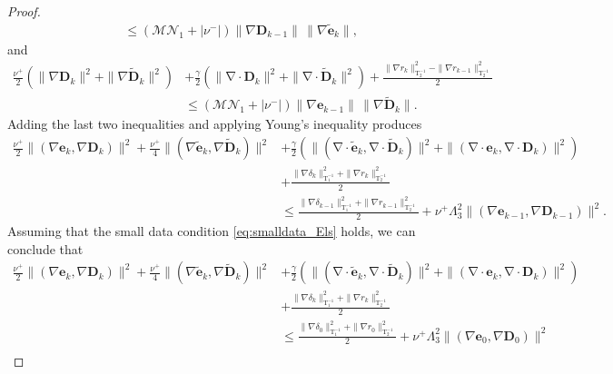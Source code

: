 \documentclass[3p]{elsarticle}
\def\nuplus{\nu^{+}}
\def\numinus{\nu^{-}}
\def\V#1{\mathbf{#1}}
\def\Vt#1{\mathbf{\tilde{#1}}}
\newcommand{\Mbd}{\mathcal{M}}
\newcommand{\Nbd}{\mathcal{N}}
\newcommand{\divergence}{\mathrm{\nabla \cdot}}
\newcommand{\Luinvmap}{\mathrm{T_1^{-1}}}
\newcommand{\Lbinvmap}{\mathrm{T_2^{-1}}}
\begin{document}
\begin{proof}
\begin{equation}
\begin{aligned}
& \le \left(\Mbd \Nbd_1 + |\numinus| \right) \|\nabla \V{D}_{k-1} \|\, \|\nabla \Vt{e}_{k} \|,
\end{aligned}
\end{equation}
and
\begin{equation}\label{eq:err8_Els}
\begin{aligned} 
\frac{\nuplus}{2} \left( \|\nabla \V{D}_{k} \|^2 + \|\nabla \Vt{D}_{k} \|^2 \right) & + 
\frac{\gamma}{2} \left( \|\divergence \V{D}_{k} \|^2 + \|\divergence \Vt{D}_{k} \|^2\right) + \frac{\|\nabla r_{k} \|^2_{\Lbinvmap} - \|\nabla r_{k-1} \|^2_{\Lbinvmap}}{2} \\ 
& \le \left(\Mbd \Nbd_1 + |\numinus| \right) \|\nabla \V{e}_{k-1} \|\, \|\nabla \Vt{D}_{k} \|.
\end{aligned}
\end{equation}
Adding the last two inequalities and applying Young's inequality produces
\begin{equation}\label{eq:err9_Els}   
\begin{aligned}
\frac{\nuplus}{2} \| (\nabla \V{e}_{k},\nabla \V{D}_{k}) \|^2 +  \frac{\nuplus}{4} \| (\nabla \Vt{e}_{k}, \nabla \Vt{D}_{k}) \|^2
& + \frac{\gamma}{2}\left( \|(\divergence \Vt{e}_{k},\divergence \Vt{D}_{k}) \|^2 + \|(\divergence \V{e}_{k},\divergence \V{D}_{k}) \|^2 \right) \\
& + \frac{ \|\nabla \delta_{k} \|^2_{\Luinvmap} +  \|\nabla r_{k} \|^2_{\Lbinvmap}}{2} \\
& \le \frac{ \|\nabla \delta_{k-1} \|^2_{\Luinvmap} +  \|\nabla r_{k-1} \|^2_{\Lbinvmap}}{2} + \nuplus \Lambda_3^2 \| (\nabla \V{e}_{k-1},\nabla \V{D}_{k-1}) \|^2 .
\end{aligned}
\end{equation}
Assuming that the small data condition \eqref{eq:smalldata_Els} holds, we can conclude that
\begin{equation}\label{eq:err10_Els}   
\begin{aligned}
\frac{\nuplus}{2} \| (\nabla \V{e}_{k},\nabla \V{D}_{k}) \|^2 +  \frac{\nuplus}{4} \| (\nabla \Vt{e}_{k}, \nabla \Vt{D}_{k}) \|^2
& + \frac{\gamma}{2}\left( \|(\divergence \Vt{e}_{k},\divergence \Vt{D}_{k}) \|^2 + \|(\divergence \V{e}_{k},\divergence \V{D}_{k}) \|^2 \right) \\
& + \frac{ \|\nabla \delta_{k} \|^2_{\Luinvmap} +  \|\nabla r_{k} \|^2_{\Lbinvmap}}{2} \\
& \le \frac{ \|\nabla \delta_{0} \|^2_{\Luinvmap} +  \|\nabla r_{0} \|^2_{\Lbinvmap}}{2} + \nuplus \Lambda_3^2 \| (\nabla \V{e}_{0},\nabla \V{D}_{0}) \|^2 \\

\end{aligned}
\end{equation}
\end{proof}
\end{document}
